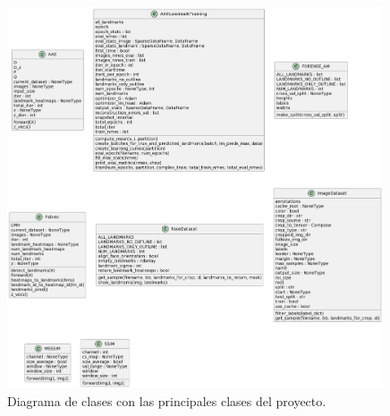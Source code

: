 \begin{figure}[!h]
    \centering
    \includegraphics[width=0.99\textwidth]{img/diagrama_clases.png}
    \caption{Diagrama de clases con las principales clases del proyecto.}
    \label{fig:Diagrama_clases}
\end{figure}

